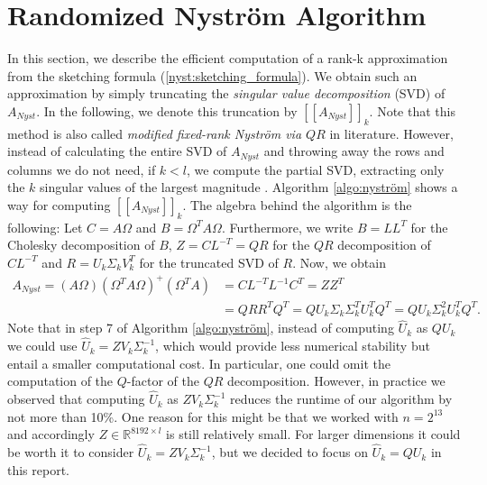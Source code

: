 \documentclass{article}
\theoremstyle{definition}
\begin{document}
\section{Randomized Nyström Algorithm}\label{sec:rand_nystrom_alg}
In this section, we describe the efficient computation of a rank-k approximation from the sketching formula (\ref{nyst:sketching_formula}). We obtain such an approximation by simply truncating the \textit{singular value decomposition} (SVD) of $A_{Nyst}$. In the following, we denote this truncation by $[\![A_{Nyst}]\!]_k$. Note that this method is also called \textit{modified fixed-rank Nyström via $QR$} in literature. However, instead of calculating the entire SVD of $A_{Nyst}$ and throwing away the rows and columns we do not need, if $k<l$, we compute the partial SVD, extracting only the $k$ singular values of the largest magnitude \cite{scipy_svds}. Algorithm \ref{algo:nyström} shows a way for computing $[\![A_{Nyst}]\!]_k$. The algebra behind the algorithm is the following: Let $C = A \Omega$ and $B = \Omega^T A \Omega$. Furthermore, we write $B = LL^T$ for the Cholesky decomposition of $B$, $Z = C L^{-T} = QR$ for the $QR$ decomposition of $C L^{-T}$ and $R = U_k \Sigma_k V_k^T$ for the truncated SVD of $R$. Now, we obtain
\begin{align*}
    A_{Nyst} = (A \Omega) (\Omega^T A \Omega)^+ (\Omega^T A) &= CL^{-T}L^{-1}C^T = ZZ^T \\
    &= QRR^TQ^T = QU_k\Sigma_k \Sigma_k^T U_k^TQ^T = QU_k\Sigma_k^2 U_k^TQ^T.
\end{align*}
 Note that in step 7 of Algorithm \ref{algo:nyström}, instead of computing $\hat{U}_k$ as $Q U_k$ we could use $\hat{U}_k = Z V_k \Sigma_k^{-1}$, which would provide less numerical stability but entail a smaller computational cost. In particular, one could omit the computation of the $Q$-factor of the $QR$ decomposition. However, in practice we observed that computing $\hat{U}_k$ as $Z V_k \Sigma_k^{-1}$ reduces the runtime of our algorithm by not more than 10\%. One reason for this might be that we worked with $n=2^{13}$ and accordingly $Z \in \mathbb{R}^{8192 \times l}$ is still relatively small. For larger dimensions it could be worth it to consider $\hat{U}_k = Z V_k \Sigma_k^{-1}$, but we decided to focus on $\hat{U}_k = Q U_k$ in this report.
 
\end{document}
